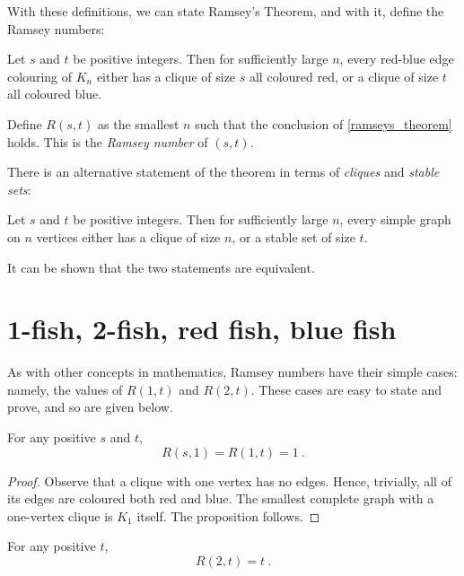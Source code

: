 \documentclass{article}
\begin{document}
With these definitions, we can state Ramsey's Theorem, and with it, define the Ramsey numbers:

\begin{Theorem} \label{ramseys_theorem}
    Let $s$ and $t$ be positive integers. Then for sufficiently large $n$, every red-blue edge colouring of $K_n$ either has a clique of size $s$ all coloured red, or a clique of size $t$ all coloured blue.
\end{Theorem}

\begin{Definition}
    Define $R(s,t)$ as the smallest $n$ such that the conclusion of \cref{ramseys_theorem} holds. This is the \textit{Ramsey number} of $(s,t)$.
\end{Definition}

There is an alternative statement of the theorem in terms of \textit{cliques} and \textit{stable sets}:

\begin{Theorem}
    Let $s$ and $t$ be positive integers. Then for sufficiently large $n$, every simple graph on $n$ vertices either has a clique of size $n$, or a stable set of size $t$.
\end{Theorem}

It can be shown that the two statements are equivalent.

\section{1-fish, 2-fish, red fish, blue fish}

As with other concepts in mathematics, Ramsey numbers have their simple cases: namely, the values of $R(1,t)$ and $R(2,t)$. These cases are easy to state and prove, and so are given below.

\begin{Proposition}
    For any positive $s$ and $t$,
    \[ R(s,1) = R(1,t) = 1 \ . \]
\end{Proposition}

\begin{proof}
    Observe that a clique with one vertex has no edges. Hence, trivially, all of its edges are coloured both red and blue. The smallest complete graph with a one-vertex clique is $K_1$ itself. The proposition follows.
\end{proof}

\begin{Proposition}
    For any positive $t$,
    \[ R(2,t) = t \ . \]
\end{Proposition}
\end{document}
